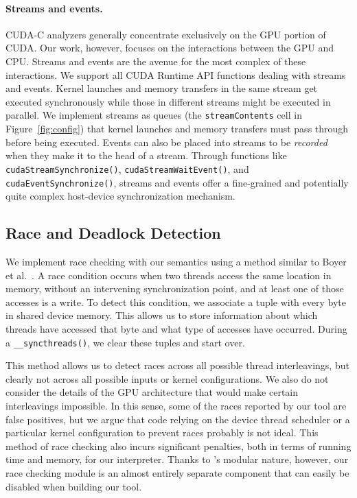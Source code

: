 \paragraph{Streams and events.}
CUDA-C analyzers generally concentrate exclusively on the GPU portion of CUDA.
Our work, however, focuses on the interactions between the GPU and CPU. Streams
and events are the avenue for the most complex of these interactions. 
We support all CUDA Runtime API functions dealing with streams and events.
Kernel launches and memory transfers in the same stream get executed
synchronously while those in different streams might be executed in parallel. We
implement streams as queues (the {\tt streamContents} cell in
Figure~\ref{fig:config}) that kernel launches and memory transfers must pass
through before being executed. Events can also be placed into streams to be {\em
recorded} when they make it to the head of a stream. Through functions like {\tt
cudaStreamSynchronize()}, {\tt cudaStreamWaitEvent()}, and {\tt
cudaEventSynchronize()}, streams and events offer a fine-grained and potentially
quite complex host-device synchronization mechanism.

\subsection{Race and Deadlock Detection}

We implement race checking with our semantics using a method similar to Boyer et
al.~\cite{boyer:stmcs08}. A race condition occurs when two threads access the
same location in memory, without an intervening synchronization point, and at
least one of those accesses is a write. To detect this condition, we associate a
tuple with every byte in shared device memory. This allows us to store
information about which threads have accessed that byte and what type of
accesses have occurred. During a {\tt \_\_syncthreads()}, we clear these tuples
and start over.

This method allows us to detect races across all possible thread interleavings,
but clearly not across all possible inputs or kernel configurations. We also do
not consider the details of the GPU architecture that would make certain
interleavings impossible. In this sense, some of the races reported by our tool
are false positives, but we argue that code relying on the device thread
scheduler or a particular kernel configuration to prevent races probably is not
ideal. This method of race checking also incurs significant penalties, both in
terms of running time and memory, for our interpreter. Thanks to \K's modular
nature, however, our race checking module is an almost entirely separate
component that can easily be disabled when building our tool.

